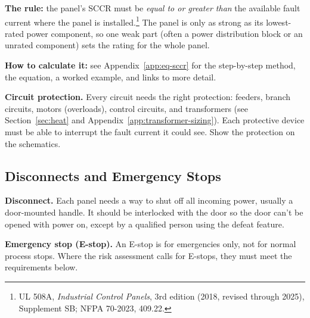 \textbf{The rule:} the panel's SCCR must be \emph{equal to or greater than} the available fault current where the panel is installed.\footnote{UL 508A, \emph{Industrial Control Panels}, 3rd edition (2018, revised through 2025), Supplement SB; NFPA 70-2023, 409.22.} The panel is only as strong as its lowest-rated power component, so one weak part (often a power distribution block or an unrated component) sets the rating for the whole panel.

\textbf{How to calculate it:} see Appendix~\ref{app:eq-sccr} for the step-by-step method, the equation, a worked example, and links to more detail.

\textbf{Circuit protection.} Every circuit needs the right protection: feeders, branch circuits, motors (overloads), control circuits, and transformers (see Section~\ref{sec:heat} and Appendix~\ref{app:transformer-sizing}). Each protective device must be able to interrupt the fault current it could see. Show the protection on the schematics.

\subsection{Disconnects and Emergency Stops}\label{sec:estop}
\textbf{Disconnect.} Each panel needs a way to shut off all incoming power, usually a door-mounted handle. It should be interlocked with the door so the door can't be opened with power on, except by a qualified person using the defeat feature.

\textbf{Emergency stop (E-stop).} An E-stop is for emergencies only, not for normal process stops. Where the risk assessment calls for E-stops, they must meet the requirements below.

